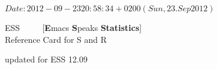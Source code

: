 \documentclass[a4paper]{article}
\begin{document}
\SVN $Date: 2012-09-23 20:58:34 +0200 (Sun, 23. Sep 2012) $
\begin{center}
  {\LARGE ESS \ \ \ \ {\large
      [\textbf{E}macs \textbf{S}peaks \textbf{Statistics}]}
      \\[.5ex] Reference Card for S and R}

  \smallskip

  {\small updated for ESS 12.09}%
  \\[1ex] {\tiny \SVNDate}
\end{center}
\end{document}

